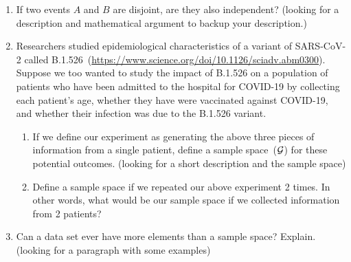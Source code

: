 \begin{enumerate}
   \item If two events $A$ and $B$ are disjoint, are they also independent? (looking for a description and mathematical argument to backup your description.)
   
   \item Researchers studied epidemiological characteristics of a variant of SARS-CoV-2 called B.1.526~(\url{https://www.science.org/doi/10.1126/sciadv.abm0300}). Suppose we too wanted to study the impact of B.1.526 on a population of patients who have been admitted to the hospital for COVID-19 by collecting each patient's age, whether they have were vaccinated against COVID-19, and whether their infection was due to the B.1.526 variant.
   
   \begin{enumerate}
       \item If we define our experiment as generating the above three pieces of information from a single patient, define a sample space~($\mathcal{G}$) for these potential outcomes. (looking for a short description and the sample space)
       \item Define a sample space if we repeated our above experiment 2 times. In other words, what would be our sample space if we collected information from 2 patients? 
   \end{enumerate}
    
   \item Can a data set ever have more elements than a sample space? Explain. (looking for a paragraph with some examples)
   

\end{enumerate}
